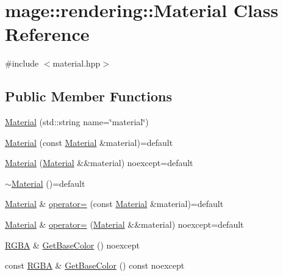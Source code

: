 \hypertarget{classmage_1_1rendering_1_1_material}{}\section{mage\+:\+:rendering\+:\+:Material Class Reference}
\label{classmage_1_1rendering_1_1_material}


{\ttfamily \#include $<$material.\+hpp$>$}

\subsection*{Public Member Functions}
\begin{DoxyCompactItemize}
\item 
\mbox{\hyperlink{classmage_1_1rendering_1_1_material_a9cc8786b2f56dc53b6e0e0b80e5439e3}{Material}} (std\+::string name=\char`\"{}material\char`\"{})
\item 
\mbox{\hyperlink{classmage_1_1rendering_1_1_material_ac7cffca59fe250f10c2e68a875a03e91}{Material}} (const \mbox{\hyperlink{classmage_1_1rendering_1_1_material}{Material}} \&material)=default
\item 
\mbox{\hyperlink{classmage_1_1rendering_1_1_material_a52f4b3b0849b96306ea79c746070c6ba}{Material}} (\mbox{\hyperlink{classmage_1_1rendering_1_1_material}{Material}} \&\&material) noexcept=default
\item 
\mbox{\hyperlink{classmage_1_1rendering_1_1_material_a0dcdba799e013b2a8ff0108b14b9a73c}{$\sim$\+Material}} ()=default
\item 
\mbox{\hyperlink{classmage_1_1rendering_1_1_material}{Material}} \& \mbox{\hyperlink{classmage_1_1rendering_1_1_material_a535022bb3c1264412278337fc3d5d717}{operator=}} (const \mbox{\hyperlink{classmage_1_1rendering_1_1_material}{Material}} \&material)=default
\item 
\mbox{\hyperlink{classmage_1_1rendering_1_1_material}{Material}} \& \mbox{\hyperlink{classmage_1_1rendering_1_1_material_a2f90e0eeb8283da70db48fc1618aed10}{operator=}} (\mbox{\hyperlink{classmage_1_1rendering_1_1_material}{Material}} \&\&material) noexcept=default
\item 
\mbox{\hyperlink{structmage_1_1_r_g_b_a}{R\+G\+BA}} \& \mbox{\hyperlink{classmage_1_1rendering_1_1_material_a9dd92f97dbae7cfbdae55759c20f6887}{Get\+Base\+Color}} () noexcept
\item 
const \mbox{\hyperlink{structmage_1_1_r_g_b_a}{R\+G\+BA}} \& \mbox{\hyperlink{classmage_1_1rendering_1_1_material_aa98da3297c5043b9107638c877382bd8}{Get\+Base\+Color}} () const noexcept

\end{DoxyCompactItemize}
